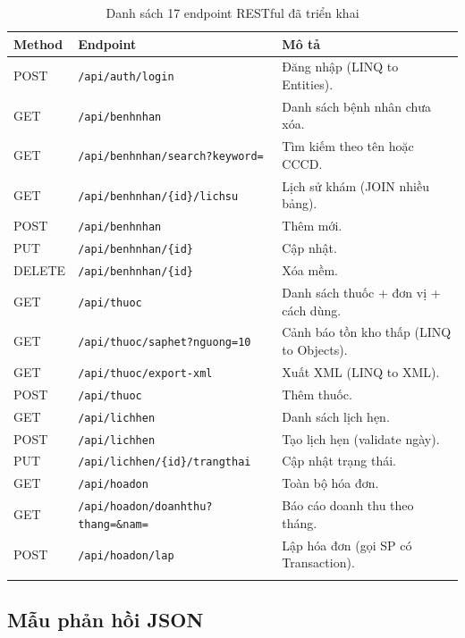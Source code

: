\documentclass[12pt,a4paper]{report}
\begin{document}
\begin{longtable}{|l|l|p{8cm}|}
\hline
\textbf{Method} & \textbf{Endpoint} & \textbf{Mô tả} \\
\hline\endhead
POST   & \texttt{/api/auth/login}                & Đăng nhập (LINQ to Entities). \\\hline
GET    & \texttt{/api/benhnhan}                  & Danh sách bệnh nhân chưa xóa. \\\hline
GET    & \texttt{/api/benhnhan/search?keyword=}  & Tìm kiếm theo tên hoặc CCCD. \\\hline
GET    & \texttt{/api/benhnhan/\{id\}/lichsu}    & Lịch sử khám (JOIN nhiều bảng). \\\hline
POST   & \texttt{/api/benhnhan}                  & Thêm mới. \\\hline
PUT    & \texttt{/api/benhnhan/\{id\}}           & Cập nhật. \\\hline
DELETE & \texttt{/api/benhnhan/\{id\}}           & Xóa mềm. \\\hline
GET    & \texttt{/api/thuoc}                     & Danh sách thuốc + đơn vị + cách dùng. \\\hline
GET    & \texttt{/api/thuoc/saphet?nguong=10}    & Cảnh báo tồn kho thấp (LINQ to Objects). \\\hline
GET    & \texttt{/api/thuoc/export-xml}          & Xuất XML (LINQ to XML). \\\hline
POST   & \texttt{/api/thuoc}                     & Thêm thuốc. \\\hline
GET    & \texttt{/api/lichhen}                   & Danh sách lịch hẹn. \\\hline
POST   & \texttt{/api/lichhen}                   & Tạo lịch hẹn (validate ngày). \\\hline
PUT    & \texttt{/api/lichhen/\{id\}/trangthai}  & Cập nhật trạng thái. \\\hline
GET    & \texttt{/api/hoadon}                    & Toàn bộ hóa đơn. \\\hline
GET    & \texttt{/api/hoadon/doanhthu?thang=\&nam=} & Báo cáo doanh thu theo tháng. \\\hline
POST   & \texttt{/api/hoadon/lap}                & Lập hóa đơn (gọi SP có Transaction). \\\hline
\caption{Danh sách 17 endpoint RESTful đã triển khai}
\end{longtable}

\subsection{Mẫu phản hồi JSON}
\end{document}
